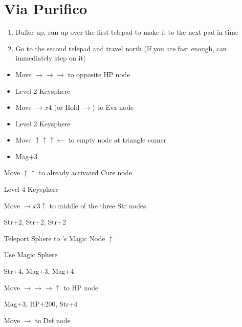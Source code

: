 \chapter{Via Purifico}

\begin{enumerate}
    \item Buffer up, run up over the first telepad to make it to the next pad in time
    \item Go to the second telepad and travel north (If you are fast enough, can immediately step on it)
\end{enumerate}
\begin{spheregrid}
    \begin{itemize}
        \auronf
        \begin{itemize}
            \item Move $\rightarrow\rightarrow\rightarrow$ to opposite HP node
            \item Level 2 Keysphere
            \item Move $\rightarrow x4$ (or Hold $\rightarrow$) to Eva node
            \item Level 2 Keysphere
            \item Move $\uparrow\uparrow\uparrow\leftarrow$ to empty node at triangle corner
            \item Mag+3
        \end{itemize}
        \yunaf
        \begin{itemize}
            \begin{multicols}{2}
                \item Move $\uparrow\uparrow$ to already activated Cure node
                \item Level 4 Keysphere
                \item Move $\rightarrow x3 \uparrow$ to middle of the three Str nodes
                \item Str+2, Str+2, Str+2
                \item Teleport Sphere to \auron's Magic Node $\uparrow$
                \item Use Magic Sphere
                \item Str+4, Mag+3, Mag+4
                \item Move $\rightarrow\rightarrow\rightarrow\uparrow$ to HP node
                \item Mag+3, HP+200, Str+4
                \item Move $\rightarrow$ to Def node

\end{multicols}
\end{itemize}
\end{itemize}
\end{spheregrid}
